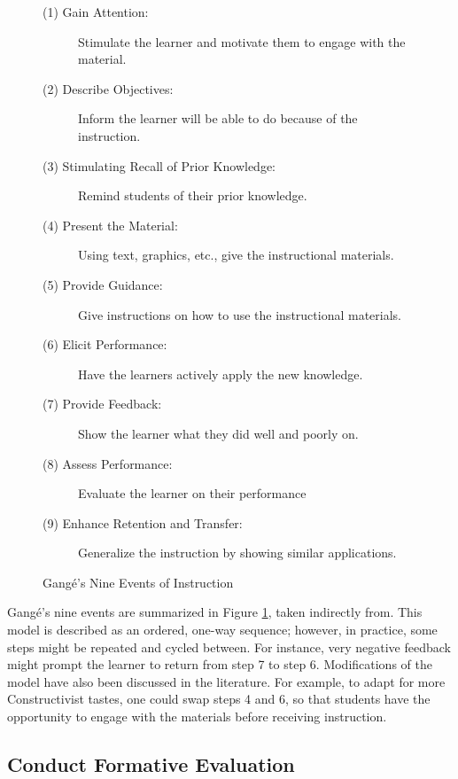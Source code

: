 \documentclass{sig-alternate}
\begin{document}
\begin{figure}
\begin{description}
	\item[(1) Gain Attention:] Stimulate the learner and motivate them to engage with the material.
	\item[(2) Describe Objectives:] Inform the learner will be able to do because of the instruction.
	\item[(3) Stimulating Recall of Prior Knowledge:] Remind students of their prior knowledge.
	\item[(4) Present the Material:] Using text, graphics, etc., give the instructional materials.
	\item[(5) Provide Guidance:] Give instructions on how to use the instructional materials.
	\item[(6) Elicit Performance:] Have the learners actively apply the new knowledge.
	\item[(7) Provide Feedback:] Show the learner what they did well and poorly on.
	\item[(8) Assess Performance:] Evaluate the learner on their performance
	\item[(9) Enhance Retention and Transfer:] Generalize the instruction by showing similar applications.
\end{description}
\caption{Gang\'{e}'s Nine Events of Instruction}
\label{gange-events}
\end{figure}

Gang\'{e}'s nine events are summarized in Figure \ref{gange-events}, taken indirectly from\cite{gagne1985conditions}. This model is described as an ordered, one-way sequence; however, in practice, some steps might be repeated and cycled between. For instance, very negative feedback might prompt the learner to return from step 7 to step 6. Modifications of the model have also been discussed in the literature. For example, to adapt for more Constructivist tastes, one could swap steps 4 and 6, so that students have the opportunity to engage with the materials before receiving instruction.


\subsection{Conduct Formative Evaluation}
\end{document}
